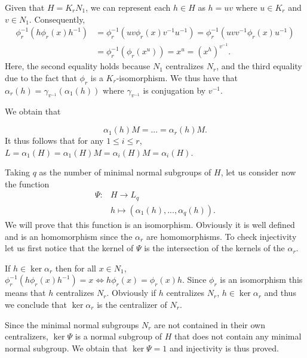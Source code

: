 Given that $H = K_rN_1$, we can represent each $h \in H$ as $h = uv$ where $u \in K_r$ and $v \in N_1$. Consequently,
\begin{align*}
    \phi_r^{-1}(h\phi_r(x)h^{-1}) &= \phi_r^{-1}(uv\phi_r(x)v^{-1}u^{-1}) = \phi_r^{-1}(uvv^{-1}\phi_r(x)u^{-1}) \\
    &= \phi_r^{-1}(\phi_r(x^{u})) = x^u = (x^h)^{v^{-1}}.
\end{align*}
Here, the second equality holds because $N_1$ centralizes $N_r$, and the third equality due to the fact that $\phi_r$ is a $K_r$-isomorphism.
We thus have that $\alpha_r(h) = \gamma_{v^{-1}}(\alpha_1(h))$ where $\gamma_{v^{-1}}$ is conjugation by $v^{-1}$.

We obtain that 

$$
\alpha_1(h)M = ... = \alpha_r(h)M. 
$$
It thus follows that for any $1 \le i \le r$, $L = \alpha_1(H) = \alpha_1(H)M = \alpha_i(H)M = \alpha_i(H)$.

Taking $q$ as the number of minimal normal subgroups of $H$, let us consider now the function
\begin{align*}
    \Psi \colon &H \rightarrow L_q \\
                &h \mapsto (\alpha_1(h),..., \alpha_q(h)).
\end{align*}
We will prove that this function is an isomorphism.
Obviously it is well defined and is an homomorphism since the $\alpha_r$ are homomorphisms. To check injectivity let us first notice that the kernel of $\Psi$ is the intersection of the kernels of the $\alpha_r$. 

If $h \in \ker \alpha_r$ then for all $x \in N_1$, $\phi_r^{-1}(h\phi_r(x)h^{-1}) = x \iff h\phi_r(x) = \phi_r(x)h$. Since $\phi_r$ is an isomorphism this means that $h$ centralizes $N_r$. Obviously if $h$ centralizes $N_r$, $h \in \ker \alpha_r$ and thus we conclude that $\ker \alpha_r$ is the centralizer of $N_r$. 

Since the minimal normal subgroups $N_r$ are not contained in their own centralizers, $\ker \Psi$ is a normal subgroup of $H$ that does not contain any minimal normal subgroup. 
We obtain that $\ker \Psi = 1$  and injectivity is thus proved.

